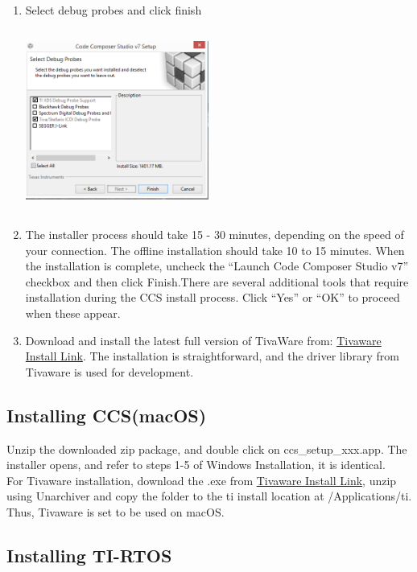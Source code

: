 \documentclass[a4paper,12pt,oneside]{book}
\begin{document}
\begin{enumerate}
\begin{center}
\end{center}
\item Select debug probes and click finish \\
\begin{center}
\includegraphics[width=6cm, height=6cm]{MiscImages/CCSInstall4}
\end{center}
\item The installer process	should take 15 - 30 minutes, depending on the speed of your connection. The offline installation should take 10 to 15 minutes. When the installation is complete, uncheck the “Launch Code Composer Studio v7” checkbox and then click Finish.There are several additional tools that require installation during the CCS install process. Click “Yes” or “OK” to proceed when these appear. \\
\item Download and install the latest full version of TivaWare from: \href{http://www.ti.com/tool/sw-tm4c}{Tivaware Install Link}. The installation is straightforward, and the driver library from Tivaware is used for development.
\end{enumerate}

\subsection{Installing CCS(macOS)}
Unzip the downloaded zip package, and double click on ccs\_setup\_xxx.app. The installer opens, and refer to steps 1-5 of Windows Installation, it is identical. \\
For Tivaware installation, download the .exe from \href{http://www.ti.com/tool/sw-tm4c}{Tivaware Install Link}, unzip using Unarchiver and copy the folder to the ti install location at /Applications/ti. Thus, Tivaware is set to be used on macOS.

\subsection{Installing TI-RTOS}
\end{document}
